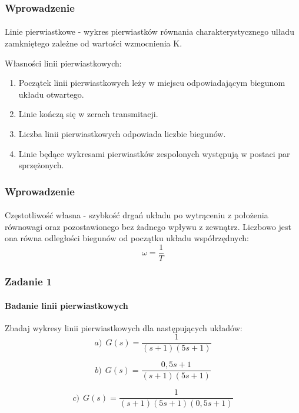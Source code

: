 \documentclass{beamer}
\begin{document}
\begin{frame}\frametitle{Wprowadzenie}\framesubtitle{}
	Linie pierwiastkowe - wykres pierwiastków równania charakterystycznego ulładu zamkniętego zależne od wartości wzmocnienia K.
	
	Własności linii pierwiastkowych:
	\begin{enumerate}
		\item Początek linii pierwiastkowych leży w miejscu odpowiadającym biegunom układu otwartego.
		
		\item Linie kończą się w zerach transmitacji.
		
		\item Liczba linii pierwiastkowych odpowiada liczbie biegunów.
		
		\item Linie będące wykresami pierwiastków zespolonych występują w postaci par sprzężonych.
	\end{enumerate}
\end{frame}

\begin{frame}\frametitle{Wprowadzenie}\framesubtitle{}
	Częstotliwość własna - szybkość drgań układu po wytrąceniu z położenia równowagi oraz pozostawionego bez żadnego wpływu z zewnątrz. Liczbowo jest ona równa odległości biegunów od początku układu współrzędnych:
	\[
		\omega = \frac{1}{T}
	\]
\end{frame}


\begin{frame}\frametitle{Zadanie 1}\framesubtitle{Badanie linii pierwiastkowych}
Zbadaj wykresy linii pierwiastkowych dla następujących układów:
\[
a) ~~ G(s) = \frac{1}{(s+1)(5s+1)}
\]

\[
b) ~~ G(s) = \frac{0,5s + 1}{(s+1)(5s+1)}
\]

\[
c) ~~ G(s) = \frac{1}{(s+1)(5s+1)(0,5s + 1)}
\]
\end{frame}

\end{document}

